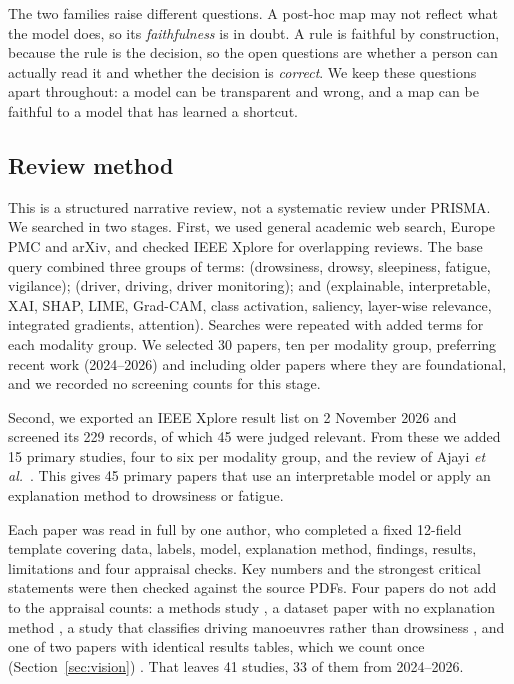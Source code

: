 The two families raise different questions. A post-hoc map may not reflect what the model does, so its \textit{faithfulness} is in doubt. A rule is faithful by construction, because the rule is the decision, so the open questions are whether a person can actually read it and whether the decision is \textit{correct}. We keep these questions apart throughout: a model can be transparent and wrong, and a map can be faithful to a model that has learned a shortcut.

\subsection{Review method}
This is a structured narrative review, not a systematic review under PRISMA. We searched in two stages. First, we used general academic web search, Europe PMC and arXiv, and checked IEEE Xplore for overlapping reviews. The base query combined three groups of terms: (drowsiness, drowsy, sleepiness, fatigue, vigilance); (driver, driving, driver monitoring); and (explainable, interpretable, XAI, SHAP, LIME, Grad-CAM, class activation, saliency, layer-wise relevance, integrated gradients, attention). Searches were repeated with added terms for each modality group. We selected 30 papers, ten per modality group, preferring recent work (2024--2026) and including older papers where they are foundational, and we recorded no screening counts for this stage.

Second, we exported an IEEE Xplore result list on 2 November 2026 and screened its 229 records, of which 45 were judged relevant. From these we added 15 primary studies, four to six per modality group, and the review of Ajayi \textit{et al.}~\cite{ajayi2025multimodal}.  This gives 45 primary papers that use an interpretable model or apply an explanation method to drowsiness or fatigue.

Each paper was read in full by one author, who completed a fixed 12-field template covering data, labels, model, explanation method, findings, results, limitations and four appraisal checks. Key numbers and the strongest critical statements were then checked against the source PDFs. Four papers do not add to the appraisal counts: a methods study \cite{cui2023towards}, a dataset paper with no explanation method \cite{ghoddoosian2019realistic}, a study that classifies driving manoeuvres rather than drowsiness \cite{askari2026physiologically}, and one of two papers with identical results tables, which we count once (Section~\ref{sec:vision}) \cite{sasikala2026robust,nayomi2026vision}. That leaves 41 studies, 33 of them from 2024--2026.

